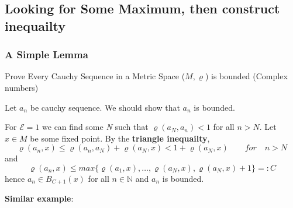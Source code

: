 \documentclass[titlepage,a4paper,12pt]{article}
\theoremstyle{nonumberplain}
\newtheorem{Proof}{\hskip 2em Proof}
\begin{document}
\subsection{Looking for Some Maximum, then construct inequailty}
\subsubsection{A Simple Lemma}
Prove Every Cauchy Sequence in a Metric Space ($M,\varrho$) is bounded (Complex numbers)
\begin{Proof}
Let $a_n$ be cauchy sequence. We should show that $a_n$ is bounded.\par
For $\mathcal{E}=1$ we can find some \emph{N} such that $\varrho(a_N,a_n)<1$ for all $n>N$. Let $x\in M$ be some fixed point. By the \textbf{triangle inequailty},
$$\varrho(a_n,x)\leq \varrho(a_n,a_N)+\varrho(a_N,x)<1+\varrho(a_N,x)\qquad for\quad n>N$$
and
$$\varrho(a_n,x)\leq max\{\varrho(a_1,x),\dotsc,\varrho(a_N,x),\varrho(a_N,x)+1\}=:C$$
hence $a_n\in B_{C+1}(x)$ for all $n\in \mathds{N}$ and $a_n$ is bounded.
\end{Proof}
\textbf{Similar example}: 
\end{document}
